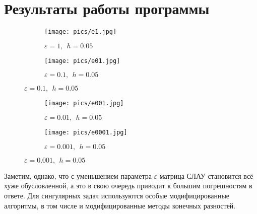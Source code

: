 \documentclass[a4paper,12pt]{extarticle}
\begin{document}
    \section{Результаты работы программы}
   
    \begin{figure}[H]
    \begin{subfigure}{0.5\textwidth}
    \texttt{[image: pics/e1.jpg]} 
    \caption{$\varepsilon=1, ~~ h = 0.05$}
    \label{fig:subim1}
    \end{subfigure}
    \begin{subfigure}{0.5\textwidth}
    \texttt{[image: pics/e01.jpg]} 
    \caption{$\varepsilon=0.1, ~~ h = 0.05$}
    \label{fig:subim1}
    \end{subfigure}
    \end{figure}
    
    \begin{figure}[H]
    \ContinuedFloat
    \begin{subfigure}{0.5\textwidth}
    \texttt{[image: pics/e001.jpg]} 
    \caption{$\varepsilon=0.01, ~~ h = 0.05$}
    \label{fig:subim1}
    \end{subfigure}
    \begin{subfigure}{0.5\textwidth}
    \texttt{[image: pics/e0001.jpg]} 
    \caption{$\varepsilon=0.001, ~~ h = 0.05$}
    \label{fig:subim1}
    \end{subfigure}
    
    \end{figure}
    
    Заметим, однако, что с уменьшением параметра $\varepsilon$ матрица СЛАУ становится всё хуже обусловленной, а это в свою очередь приводит к большим погрешностям в ответе. Для сингулярных задач используются особые модифицированные алгоритмы, в том числе и модифицированные методы конечных разностей.
    
    
\end{document}
